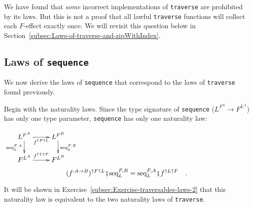 We have found that \emph{some} incorrect implementations of \lstinline!traverse!
are prohibited by its laws. But this is not a proof that all lawful
\lstinline!traverse! functions will collect each $F$-effect exactly
once. We will revisit this question below in Section~\ref{subsec:Laws-of-traverse-and-zipWithIndex}.

\subsection{Laws of \texttt{sequence}}

We now derive the laws of \lstinline!sequence! that correspond to
the laws of \lstinline!traverse! found previously. 

Begin with the naturality laws. Since the type signature of \lstinline!sequence!
($L^{F^{A}}\rightarrow F^{L^{A}}$) has only one type parameter, \lstinline!sequence!
has only one naturality law:
\begin{center}
$\xymatrix{\xyScaleY{1.5pc}\xyScaleX{2.0pc}L^{F^{A}}\ar[d]\sb(0.45){\text{seq}_{L}^{F,A}}\ar[r]\sb(0.5){f^{\uparrow F\uparrow L}} & L^{F^{B}}\ar[d]\sp(0.45){\text{seq}_{L}^{F,B}}\\
F^{L^{A}}\ar[r]\sp(0.5){f^{\uparrow L\uparrow F}} & F^{L^{B}}
}
$
\begin{equation}
(f^{:A\rightarrow B})^{\uparrow F\uparrow L}\bef\text{seq}_{L}^{F,B}=\text{seq}_{L}^{F,A}\bef f^{\uparrow L\uparrow F}\quad.\label{eq:sequence-naturality-law}
\end{equation}
\par\end{center}

It will be shown in Exercise~\ref{subsec:Exercise-traversables-laws-2}
that this naturality law is equivalent to the two naturality laws
of \lstinline!traverse!.

